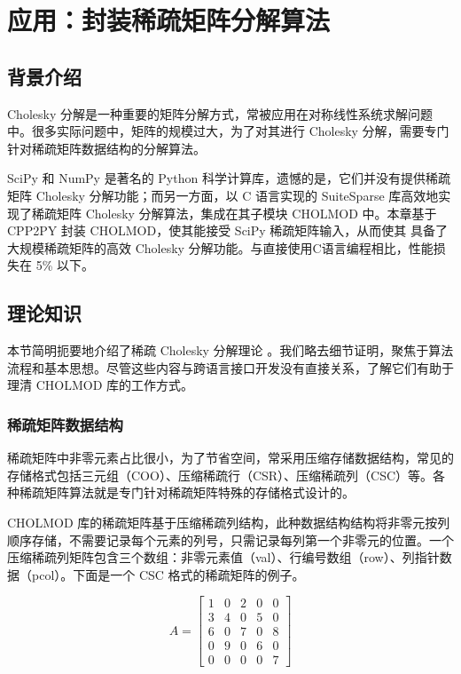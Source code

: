 
\chapter{应用：封装稀疏矩阵分解算法}

\section{背景介绍}

Cholesky 分解是一种重要的矩阵分解方式，常被应用在对称线性系统求解问题中。很多实际问题中，矩阵的规模过大，为了对其进行 Cholesky 分解，需要专门针对稀疏矩阵数据结构的分解算法。

SciPy 和 NumPy\cite{harris2020array} 是著名的 Python 科学计算库，遗憾的是，它们并没有提供稀疏矩阵 Cholesky 分解功能；而另一方面，以 C 语言实现的 SuiteSparse 库高效地实现了稀疏矩阵 Cholesky 分解算法，集成在其子模块 CHOLMOD 中。本章基于 CPP2PY 封装 CHOLMOD，使其能接受 SciPy 稀疏矩阵输入，从而使其 具备了大规模稀疏矩阵的高效 Cholesky 分解功能。与直接使用C语言编程相比，性能损失在 5\% 以下。

\section{理论知识}

本节简明扼要地介绍了稀疏 Cholesky 分解理论\cite{sparsesurvey, 邹丹2014基于,喻文健2015数值分析与算法} 。我们略去细节证明，聚焦于算法流程和基本思想。尽管这些内容与跨语言接口开发没有直接关系，了解它们有助于理清 CHOLMOD 库的工作方式。

\subsection{稀疏矩阵数据结构}

稀疏矩阵中非零元素占比很小，为了节省空间，常采用压缩存储数据结构，常见的存储格式包括三元组（COO）、压缩稀疏行（CSR）、压缩稀疏列（CSC）等。各种稀疏矩阵算法就是专门针对稀疏矩阵特殊的存储格式设计的。

CHOLMOD 库的稀疏矩阵基于压缩稀疏列结构，此种数据结构结构将非零元按列顺序存储，不需要记录每个元素的列号，只需记录每列第一个非零元的位置。一个压缩稀疏列矩阵包含三个数组：非零元素值（val）、行编号数组（row）、列指针数据（pcol）。下面是一个 CSC 格式的稀疏矩阵的例子。

\begin{equation}
A = \begin{bmatrix}
1 & 0 & 2 & 0 & 0\\
3 & 4 & 0 & 5 & 0\\
6 & 0 & 7 & 0 & 8\\
0 & 9 & 0 & 6 & 0\\
0 & 0 & 0 & 0 & 7
\end{bmatrix}    
\end{equation}

